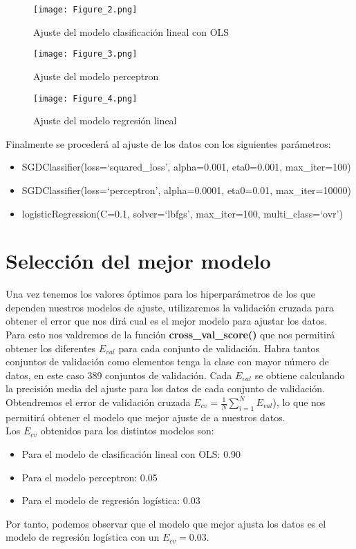 \begin{figure}[H]
   \centering
   \texttt{[image: Figure\_2.png]}
   \caption{Ajuste del modelo clasificación lineal con OLS}
\end{figure}
\begin{figure}[H]
   \centering
   \texttt{[image: Figure\_3.png]}
   \caption{Ajuste del modelo perceptron}
\end{figure}
\begin{figure}[H]
   \centering
   \texttt{[image: Figure\_4.png]}
   \caption{Ajuste del modelo regresión lineal}
\end{figure}

Finalmente se procederá al ajuste de los datos con los siguientes parámetros:
\begin{itemize}
   \item SGDClassifier(loss=`squared\_loss', alpha=0.001, eta0=0.001, max\_iter=100)
   \item SGDClassifier(loss=`perceptron', alpha=0.0001, eta0=0.01, max\_iter=10000)
   \item logisticRegression(C=0.1, solver=`lbfgs', max\_iter=100, multi\_class=`ovr')
\end{itemize}

\section{Selección del mejor modelo}
Una vez tenemos los valores óptimos para los hiperparámetros de los que dependen nuestros modelos de ajuste, utilizaremos la validación cruzada para obtener el error que nos dirá cual es el mejor modelo para ajustar los datos.\\
Para esto nos valdremos de la función \textbf{cross\_val\_score()} \cite{Score} que nos permitirá obtener los diferentes $E_{val}$ para cada conjunto de validación. Habra tantos conjuntos de validación como elementos tenga la clase con mayor número de datos, en este caso 389 conjuntos de validación. Cada $E_{val}$ se obtiene calculando la precisión media del ajuste para los datos de cada conjunto de validación. Obtendremos el error de validación cruzada $E_{cv} = \frac{1}{N}\sum_{i=1}^{N}E_{val}$), lo que nos permitirá obtener el modelo que mejor ajuste de a nuestros datos.\\
Los $E_{cv}$ obtenidos para los distintos modelos son:
\begin{itemize}
   \item Para el modelo de clasificación lineal con OLS: 0.90
   \item Para el modelo perceptron: 0.05
   \item Para el modelo de regresión logística: 0.03
\end{itemize}
Por tanto, podemos observar que el modelo que mejor ajusta los datos es el modelo de regresión logística con un $E_{cv}=0.03$.

